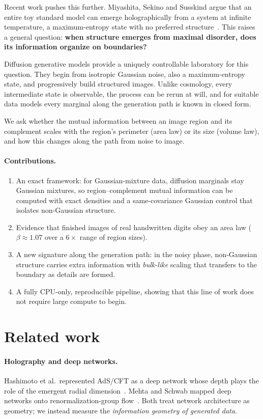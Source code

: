 \documentclass[10pt,twocolumn,a4paper]{article}
\begin{document}
Recent work pushes this further. Miyashita, Sekino and Susskind argue that an entire toy standard model can emerge holographically from a system at infinite temperature, a maximum-entropy state with no preferred structure~\cite{mss}. This raises a general question: \textbf{when structure emerges from maximal disorder, does its information organize on boundaries?}

Diffusion generative models provide a uniquely controllable laboratory for this question. They begin from isotropic Gaussian noise, also a maximum-entropy state, and progressively build structured images. Unlike cosmology, every intermediate state is observable, the process can be rerun at will, and for suitable data models every marginal along the generation path is known in closed form.

We ask whether the mutual information between an image region and its complement scales with the region's perimeter (area law) or its size (volume law), and how this changes along the path from noise to image.

\paragraph{Contributions.}
\begin{enumerate}
\item An exact framework: for Gaussian-mixture data, diffusion marginals stay Gaussian mixtures, so region--complement mutual information can be computed with exact densities and a same-covariance Gaussian control that isolates non-Gaussian structure.
\item Evidence that finished images of real handwritten digits obey an area law ($\beta \approx 1.07$ over a $6\times$ range of region sizes).
\item A new signature along the generation path: in the noisy phase, non-Gaussian structure carries extra information with \emph{bulk-like} scaling that transfers to the boundary as details are formed.
\item A fully CPU-only, reproducible pipeline, showing that this line of work does not require large compute to begin.
\end{enumerate}

\section{Related work}
\paragraph{Holography and deep networks.} Hashimoto et al.\ represented AdS/CFT as a deep network whose depth plays the role of the emergent radial dimension~\cite{hashimoto}. Mehta and Schwab mapped deep networks onto renormalization-group flow~\cite{mehta}. Both treat network architecture as geometry; we instead measure the \emph{information geometry of generated data}.
\end{document}
